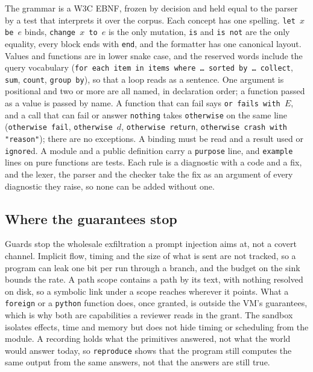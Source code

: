 \documentclass[11pt]{article}
\begin{document}
The grammar is a W3C EBNF, frozen by decision and held equal to the
parser by a test that interprets it over the corpus. Each concept has
one spelling. \texttt{let $x$ be $e$} binds, \texttt{change $x$ to $e$}
is the only mutation, \texttt{is} and \texttt{is not} are the only
equality, every block ends with \texttt{end}, and the formatter has one
canonical layout. Values and functions are in lower snake case, and the
reserved words include the query vocabulary (\texttt{for each item in
items where \ldots\ sorted by \ldots\ collect}, \texttt{sum},
\texttt{count}, \texttt{group by}), so that a loop reads as a sentence.
One argument is positional and two or more are all named, in
declaration order; a function passed as a value is passed by name. A
function that can fail says \texttt{or fails with $E$}, and a call that
can fail or answer \texttt{nothing} takes \texttt{otherwise} on the same
line (\texttt{otherwise fail}, \texttt{otherwise $d$}, \texttt{otherwise
return}, \texttt{otherwise crash with "reason"}); there are no
exceptions. A binding must be read and a result used or
\texttt{ignore}d. A module and a public definition carry a
\texttt{purpose} line, and \texttt{example} lines on pure functions are
tests. Each rule is a diagnostic with a code and a fix, and the lexer,
the parser and the checker take the fix as an argument of every
diagnostic they raise, so none can be added without one.

\subsection{Where the guarantees stop}
\label{sec:limits}

Guards stop the wholesale exfiltration a prompt injection aims at, not
a covert channel. Implicit flow, timing and the size of what is sent are
not tracked, so a program can leak one bit per run through a branch,
and the budget on the sink bounds the rate. A path scope contains a
path by its text, with nothing resolved on disk, so a symbolic link
under a scope reaches wherever it points. What a \texttt{foreign} or a
\texttt{python} function does, once granted, is outside the VM's
guarantees, which is why both are capabilities a reviewer reads in the
grant. The sandbox isolates effects, time and memory but does not hide
timing or scheduling from the module. A recording holds what the
primitives answered, not what the world would answer today, so
\texttt{reproduce} shows that the program still computes the same output
from the same answers, not that the answers are still true.
\end{document}
